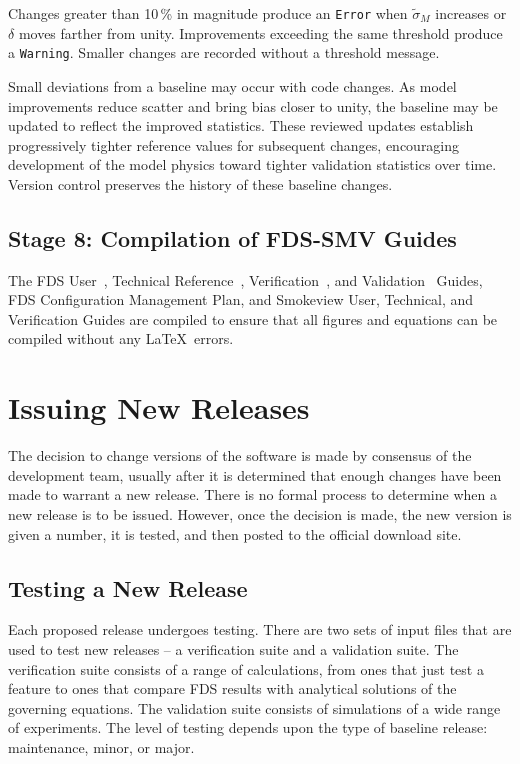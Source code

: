 \documentclass[11pt]{book}
\begin{document}
Changes greater than 10\,\% in magnitude produce an \texttt{Error} when $\tilde{\sigma}_M$ increases or $\delta$ moves farther from unity. Improvements exceeding the same threshold produce a \texttt{Warning}. Smaller changes are recorded without a threshold message.

Small deviations from a baseline may occur with code changes. As model improvements reduce scatter and bring bias closer to unity, the baseline may be updated to reflect the improved statistics. These reviewed updates establish progressively tighter reference values for subsequent changes, encouraging development of the model physics toward tighter validation statistics over time. Version control preserves the history of these baseline changes.

\subsection*{Stage 8: Compilation of FDS-SMV Guides}

The FDS User~\cite{FDS_Users_Guide}, Technical Reference~\cite{FDS_Math_Guide}, Verification~\cite{FDS_Verification_Guide}, and Validation~\cite{FDS_Validation_Guide} Guides, FDS Configuration Management Plan, and Smokeview User, Technical, and Verification Guides are compiled to ensure that all figures and equations can be compiled without any \LaTeX\ errors.


\section{Issuing New Releases}

The decision to change versions of the software is made by consensus of the development team, usually after it is determined that enough changes have been made to warrant a new release. There is no formal process to determine when a new release is to be issued. However, once the decision is made, the new version is given a number, it is tested, and then posted to the official download site.


\subsection{Testing a New Release}

Each proposed release undergoes testing. There are two sets of input files that are used to test new releases -- a verification suite and a validation suite. The verification suite consists of a range of calculations, from ones that just test a feature to ones that compare FDS results with analytical solutions of the governing equations. The validation suite consists of simulations of a wide range of experiments. The level of testing depends upon the type of baseline release: maintenance, minor, or major.
\end{document}
